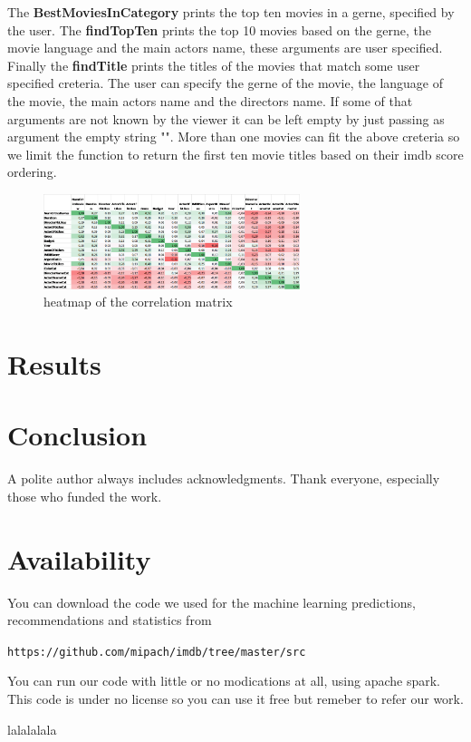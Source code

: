 \documentclass[letterpaper,twocolumn,10pt]{article}
\begin{document}
The \textbf{BestMoviesInCategory} prints the top ten movies in a gerne, specified by the user. The \textbf{findTopTen} prints the top 10 movies based on the gerne, the movie language and the main actors name, these arguments are user specified. Finally the \textbf{findTitle} prints the titles of the movies that match some user specified creteria. The user can specify the gerne of the movie, the language of the movie, the main actors name and the directors name. If some of that arguments are not known  by the viewer it can be left empty by just passing as argument the empty string "". More than one movies can fit the above creteria so we limit the function to return the first ten movie titles based on their imdb score ordering. \par

\bigskip

\begin{figure}
	
	\includegraphics[width=75mm,scale=0.3]{correlation_matrix_image}
	\caption{heatmap of the correlation matrix}
\end{figure}

\section{Results}

\section{Conclusion}

A polite author always includes acknowledgments.  Thank everyone,
especially those who funded the work. 

\section{Availability}

You can download the code we used for the machine learning predictions, recommendations and statistics from

\begin{center}
{\tt https://github.com/mipach/imdb/tree/master/src}\\
\end{center}

You can run our code with little or no modications at all, using apache spark. This code is under no license so you can use it free but remeber to refer our work.


{\footnotesize 
}
lalalalala
\end{document}
